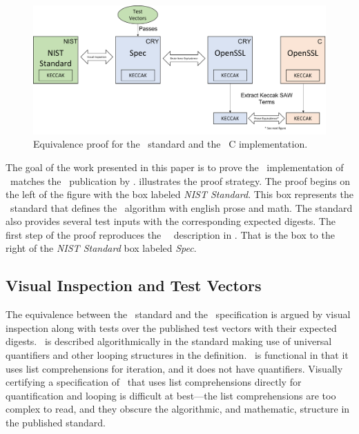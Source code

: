 \begin{figure}[t]
  \centering
  \includegraphics[width=\linewidth]{figs/proof.png}
  
  \caption{Equivalence proof for the \shaThree\ standard and the \openssl\ C implementation.}
  \label{fig:proofStructure}
  
\end{figure}

The goal of the work presented in this paper is to prove the \openssl\ implementation of \shaThree\ matches the \fips\ publication by \nist.
 illustrates the proof strategy.
The proof begins on the left of the figure with the box labeled \emph{NIST Standard}. 
This box represents the \fips\ standard that defines the \shaThree\ algorithm with english prose and math.
The standard also provides several test inputs with the corresponding expected digests.
The first step of the proof reproduces the \fips\ \shaThree\ description in \cryptol.
That is the box to the right of the \emph{NIST Standard} box labeled \emph{Spec}.

\subsection{Visual Inspection and Test Vectors}

The equivalence between the \fips\ standard and the \cryptol\ specification is argued by visual inspection along with tests over the published test vectors with their expected digests.
\shaThree\ is described algorithmically in the standard making use of universal quantifiers and other looping structures in the definition.
\cryptol\ is functional in that it uses list comprehensions for iteration, and it does not have quantifiers.
Visually certifying a specification of \shaThree\ that uses list comprehensions directly for quantification and looping is difficult at best---the list comprehensions are too complex to read, and they obscure the algorithmic, and mathematic, structure in the published standard.

